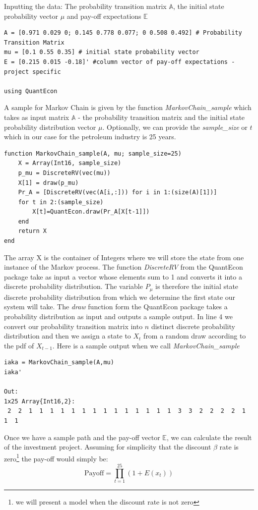 \documentclass[a4paper,12pt]{article}
\theoremstyle{definition}
\begin{document}
Inputting the data: The probability transition matrix $\mathbb{A}$, the initial state probability vector $\mu$ and pay-off expectations $\mathbb{E}$
\begin{lstlisting}
A = [0.971 0.029 0; 0.145 0.778 0.077; 0 0.508 0.492] # Probability Transition Matrix
mu = [0.1 0.55 0.35] # initial state probability vector
E = [0.215 0.015 -0.18]' #column vector of pay-off expectations - project specific

using QuantEcon
\end{lstlisting}

A sample for Markov Chain is given by the function \textit{MarkovChain\_sample} which takes as input matrix $\mathbb{A}$ - the probability transition matrix and the initial state probability distribution vector $\mu$. Optionally, we can provide the \textit{sample\_size} or $t$ which in our case for the petroleum industry is 25 years.


\begin{lstlisting}
function MarkovChain_sample(A, mu; sample_size=25)
    X = Array(Int16, sample_size)
    p_mu = DiscreteRV(vec(mu))
    X[1] = draw(p_mu)
    Pr_A = [DiscreteRV(vec(A[i,:])) for i in 1:(size(A)[1])]
    for t in 2:(sample_size)
        X[t]=QuantEcon.draw(Pr_A[X[t-1]])
    end
    return X
end
\end{lstlisting}

The array X is the container of Integers where we will store the state from one instance of the Markov process.
The function \textit{DiscreteRV} from the QuantEcon package take as input a vector whose elements sum to 1 and converts it into a discrete probability distribution. 
The variable $P_\mu$ is therefore the initial state discrete probability distribution from which we determine the first state our system will take. The \textit{draw} function form the QuantEcon package takes a probability distribution as input and outputs a sample output.
In line 4 we convert our probability transition matrix into $n$ distinct discrete probability distribution and then we assign a state to $X_t$ from a random draw according to the pdf of $X_{t-1}$. 
Here is a sample output when we call \textit{MarkovChain\_sample}
\begin{lstlisting}
iaka = MarkovChain_sample(A,mu)
iaka'

Out:
1x25 Array{Int16,2}:
 2  2  1  1  1  1  1  1  1  1  1  1  1  1  1  1  3  3  2  2  2  2  1  1  1 
\end{lstlisting}
Once we have a sample path and the pay-off vector $\mathbb{E}$, we can calculate the result of the investment project. Assuming for simplicity that the discount $\beta$ rate is zero\footnote{we will present a model when the discount rate is not zero} the pay-off would simply be:
\begin{equation}
\text{Payoff} = \prod_{t=1}^{25}(1+E(x_t))
\end{equation}
\end{document}
